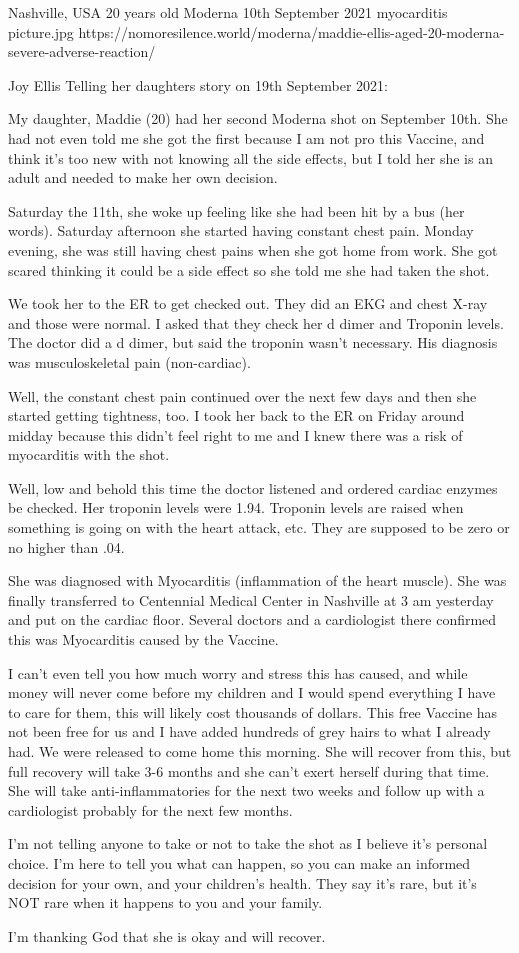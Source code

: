 {Nashville, USA}
{20 years old}
{Moderna}
{10th September 2021}
{myocarditis}
{picture.jpg}
{https://nomoresilence.world/moderna/maddie-ellis-aged-20-moderna-severe-adverse-reaction/}
{
Joy Ellis Telling her daughters story on 19th September 2021:

My daughter, Maddie (20) had her second Moderna shot on September 10th. She had not even told me she got the first because I am not pro this Vaccine, and think it’s too new with not knowing all the side effects, but I told her she is an adult and needed to make her own decision.

Saturday the 11th, she woke up feeling like she had been hit by a bus (her words). Saturday afternoon she started having constant chest pain. Monday evening, she was still having chest pains when she got home from work. She got scared thinking it could be a side effect so she told me she had taken the shot.

We took her to the ER to get checked out. They did an EKG and chest X-ray and those were normal. I asked that they check her d dimer and Troponin levels. The doctor did a d dimer, but said the troponin wasn’t necessary. His diagnosis was musculoskeletal pain (non-cardiac).

Well, the constant chest pain continued over the next few days and then she started getting tightness, too. I took her back to the ER on Friday around midday because this didn’t feel right to me and I knew there was a risk of myocarditis with the shot.

Well, low and behold this time the doctor listened and ordered cardiac enzymes be checked. Her troponin levels were 1.94. Troponin levels are raised when something is going on with the heart attack, etc. They are supposed to be zero or no higher than .04.

She was diagnosed with Myocarditis (inflammation of the heart muscle). She was finally transferred to Centennial Medical Center in Nashville at 3 am yesterday and put on the cardiac floor. Several doctors and a cardiologist there confirmed this was Myocarditis caused by the Vaccine.

I can’t even tell you how much worry and stress this has caused, and while money will never come before my children and I would spend everything I have to care for them, this will likely cost thousands of dollars. This free Vaccine has not been free for us and I have added hundreds of grey hairs to what I already had. We were released to come home this morning. She will recover from this, but full recovery will take 3-6 months and she can’t exert herself during that time. She will take anti-inflammatories for the next two weeks and follow up with a cardiologist probably for the next few months.

I’m not telling anyone to take or not to take the shot as I believe it’s personal choice. I’m here to tell you what can happen, so you can make an informed decision for your own, and your children’s health. They say it’s rare, but it’s NOT rare when it happens to you and your family.

I’m thanking God that she is okay and will recover.

}

